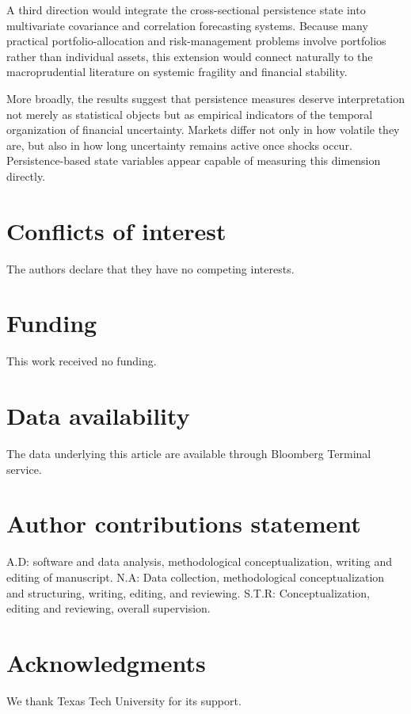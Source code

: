\documentclass[unnumsec,webpdf,contemporary,large]{oup-authoring-template}%
\theoremstyle{thmstyleone}%
\theoremstyle{thmstyletwo}%
\theoremstyle{thmstylethree}%
\begin{document}
A third direction would integrate the cross-sectional persistence state
into multivariate covariance and correlation forecasting systems. Because
many practical portfolio-allocation and risk-management problems involve
portfolios rather than individual assets, this extension would connect
naturally to the macroprudential literature on systemic fragility and
financial stability.

More broadly, the results suggest that persistence measures deserve
interpretation not merely as statistical objects but as empirical
indicators of the temporal organization of financial uncertainty. Markets
differ not only in how volatile they are, but also in how long uncertainty
remains active once shocks occur. Persistence-based state variables appear
capable of measuring this dimension directly.
\section{Conflicts of interest}
The authors declare that they have no competing interests.

\section{Funding}
This work received no funding.

\section{Data availability}
The data underlying this article are available through Bloomberg Terminal service.

\section{Author contributions statement}
A.D: software and data analysis, methodological conceptualization, writing and editing of manuscript.
N.A: Data collection, methodological conceptualization and structuring, writing, editing, and reviewing.
S.T.R: Conceptualization, editing and reviewing, overall supervision.


\section{Acknowledgments}
We thank Texas Tech University for its support.




\end{document}
